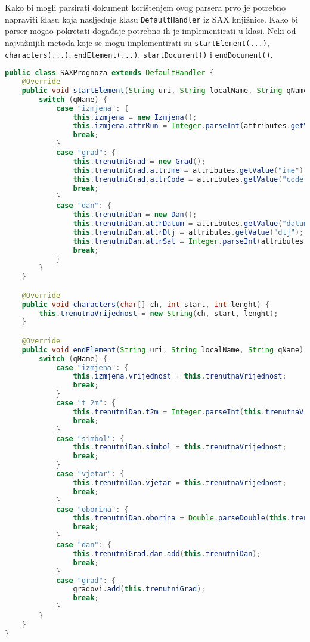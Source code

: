\documentclass[]{foi}
\begin{document}
Kako bi mogli parsirati dokument korištenjem ovog parsera prvo je potrebno napraviti
klasu koja nasljeđuje klasu \texttt{DefaultHandler} iz SAX knjižnice. Kako bi parser
mogao pokretati događaje potrebno ih je implementirati u klasi. Neki od najvažnijih
metoda koje se mogu implementirati su \texttt{startElement(...)}, \texttt{characters(...)},
\texttt{endElement(...)}. \texttt{startDocument()} i \texttt{endDocument()}.

\begin{lstlisting}[language=java, caption={Primjer implementacije metoda za prihvačanje događaja}]
public class SAXPrognoza extends DefaultHandler {
    @Override
    public void startElement(String uri, String localName, String qName, Attributes attributes) {
        switch (qName) {
            case "izmjena": {
                this.izmjena = new Izmjena();
                this.izmjena.attrRun = Integer.parseInt(attributes.getValue("run"));
                break;
            }
            case "grad": {
                this.trenutniGrad = new Grad();
                this.trenutniGrad.attrIme = attributes.getValue("ime");
                this.trenutniGrad.attrCode = attributes.getValue("code");
                break;
            }
            case "dan": {
                this.trenutniDan = new Dan();
                this.trenutniDan.attrDatum = attributes.getValue("datum");
                this.trenutniDan.attrDtj = attributes.getValue("dtj");
                this.trenutniDan.attrSat = Integer.parseInt(attributes.getValue("sat"));
                break;
            }
        }
    }

    @Override
    public void characters(char[] ch, int start, int lenght) {
        this.trenutnaVrijednost = new String(ch, start, lenght);
    }

    @Override
    public void endElement(String uri, String localName, String qName) {
        switch (qName) {
            case "izmjena": {
                this.izmjena.vrijednost = this.trenutnaVrijednost;
                break;
            }
            case "t_2m": {
                this.trenutniDan.t2m = Integer.parseInt(this.trenutnaVrijednost);
                break;
            }
            case "simbol": {
                this.trenutniDan.simbol = this.trenutnaVrijednost;
                break;
            }
            case "vjetar": {
                this.trenutniDan.vjetar = this.trenutnaVrijednost;
                break;
            }
            case "oborina": {
                this.trenutniDan.oborina = Double.parseDouble(this.trenutnaVrijednost);
                break;
            }
            case "dan": {
                this.trenutniGrad.dan.add(this.trenutniDan);
                break;
            }
            case "grad": {
                gradovi.add(this.trenutniGrad);
                break;
            }
        }
    }
}
\end{lstlisting}
\end{document}
